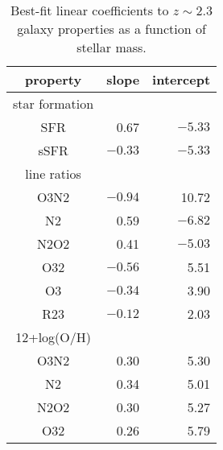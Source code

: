 \documentclass[iop,twocolappendix]{emulateapj}
\begin{document}
\begin{table}[t]
 \centering
 \caption{Best-fit linear coefficients to $z\sim2.3$ galaxy properties as a function of stellar mass.}\label{tab:bestfits}
 \begin{tabular}{ c | r r }
   \hline\hline
   property & slope & intercept \\ \hline\hline
   star formation\tablenotemark{a} & & \\ \hline
   SFR & 0.67 & $-5.33$ \\
   sSFR & $-0.33$ & $-5.33$ \\ \hline\hline
   line ratios\tablenotemark{a} & & \\ \hline
   O3N2 & $-0.94$ & 10.72 \\
   N2 & 0.59 & $-6.82$ \\
   N2O2 & 0.41 & $-5.03$ \\
   O32 & $-0.56$ & 5.51 \\
   O3 & $-0.34$ & 3.90 \\
   R23 & $-0.12$ & 2.03 \\ \hline\hline
   12+log(O/H)\tablenotemark{b} & & \\ \hline
   O3N2 & 0.30 & 5.30 \\
   N2 & 0.34 & 5.01 \\
   N2O2 & 0.30 & 5.27 \\
   O32 & 0.26 & 5.79 \\
   \hline\hline
 \end{tabular}
\end{table}
\end{document}
